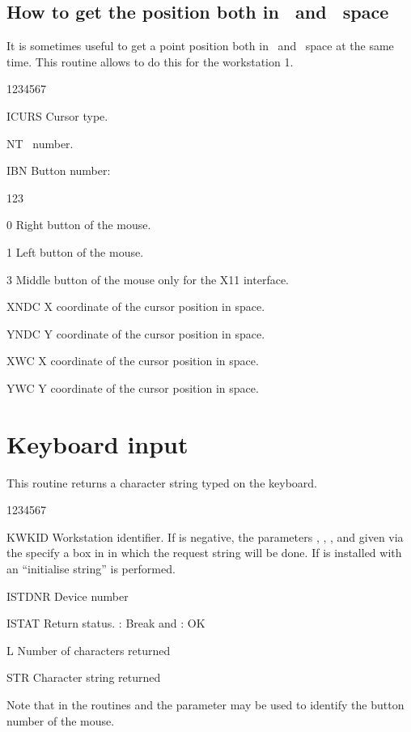\subsection{How to get the position both in \NDC~and \WC~space}
\Action
It is sometimes useful to get a point position both in \NDC~and \WC~space
at the same time. This routine allows to do this for the workstation 1.
\begin{DLtt}{1234567}
\item[ICURS] Cursor type.
\item[NT] \NT~number.
\item[IBN] Button number:
\begin{DLtt}{123}
\item[0] Right button of the mouse.
\item[1] Left button of the mouse.
\item[3] Middle button of the mouse only for the X11 interface.
\end{DLtt}
\item[XNDC] X coordinate of the cursor position in \NDC{} space.
\item[YNDC] Y coordinate of the cursor position in \NDC{} space.
\item[XWC] X coordinate of the cursor position in \WC{} space.
\item[YWC] Y coordinate of the cursor position in \WC{} space.
\end{DLtt}
 
 
\section{Keyboard input}
\Action
This routine returns a character string typed on the keyboard.
\Pdesc
\begin{DLtt}{1234567}
\item[KWKID]  Workstation identifier. If  is negative, the 
              parameters , , ,
              and  given via the  specify
              a box in \NDC{} in which the request string will be done. 
              If \HIGZ{} is installed with \GKS{} an ``initialise string''
              is performed.
\item[ISTDNR] Device number
\item[ISTAT]  Return status. : Break and : OK
\item[L]      Number of characters returned
\item[STR]    Character string returned
\end{DLtt}
\par
Note that in the routines  and  the parameter 
 may be used to identify the button number of the mouse.

